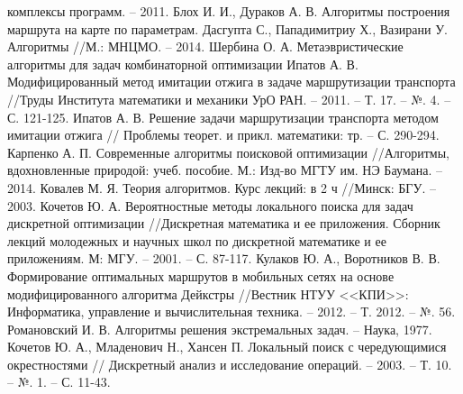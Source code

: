 \begin{thebibliography}{10}
        комплексы программ. -- 2011.
     Блох И. И., Дураков А. В. Алгоритмы построения маршрута на карте по параметрам.
     Дасгупта С., Пападимитриу Х., Вазирани У. Алгоритмы //М.: МНЦМО. -- 2014.
     Шербина О. А. Метаэвристические алгоритмы для задач комбинаторной оптимизации %
     Ипатов А. В. Модифицированный метод имитации отжига в задаче маршрутизации 
        транспорта //Труды Института математики и механики УрО РАН. -- 2011. -- Т. 17. -- №. 4. -- С. 121-125.
     Ипатов А. В. Решение задачи маршрутизации транспорта методом имитации отжига //
        Проблемы теорет. и прикл. математики: тр. -- С. 290-294.
     Карпенко А. П. Современные алгоритмы поисковой оптимизации //Алгоритмы, 
        вдохновленные природой: учеб. пособие. М.: Изд-во МГТУ им. НЭ Баумана. -- 2014.
     Ковалев М. Я. Теория алгоритмов. Курс лекций: в 2 ч //Минск: БГУ. -- 2003.
     Кочетов Ю. А. Вероятностные методы локального поиска для задач дискретной 
        оптимизации //Дискретная математика и ее приложения. Сборник лекций молодежных и научных школ 
        по дискретной математике и ее приложениям. М: МГУ. -- 2001. -- С. 87-117.
     Кулаков Ю. А., Воротников В. В. Формирование оптимальных маршрутов в мобильных сетях 
        на основе модифицированного алгоритма Дейкстры //Вестник НТУУ <<КПИ>>: Информатика, управление 
        и вычислительная техника. -- 2012. -- Т. 2012. -- №. 56.
     Романовский И. В. Алгоритмы решения экстремальных задач. -- Наука, 1977.
     Кочетов Ю. А., Младенович Н., Хансен П. Локальный поиск с чередующимися окрестностями //
        Дискретный анализ и исследование операций. -- 2003. -- Т. 10. -- №. 1. -- С. 11-43.
\end{thebibliography}

